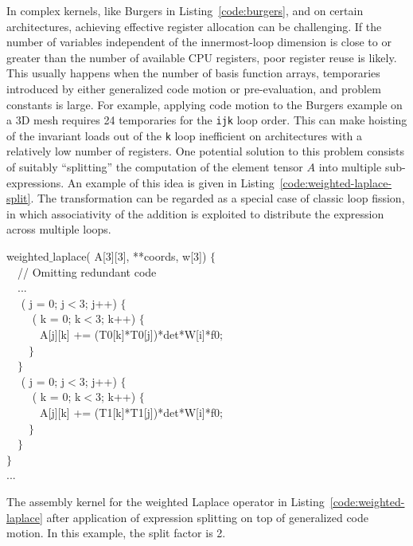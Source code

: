 In complex kernels, like Burgers in Listing~\ref{code:burgers}, and on certain architectures, achieving effective register allocation can be challenging. If the number of variables independent of the innermost-loop dimension is close to or greater than the number of available CPU registers, poor register reuse is likely. This usually happens when the number of basis function arrays, temporaries introduced by either generalized code motion or pre-evaluation, and problem constants is large. For example, applying code motion to the Burgers example on a 3D mesh requires 24 temporaries for the \texttt{ijk} loop order. This can make hoisting of the invariant loads out of the \texttt{k} loop inefficient on architectures with a relatively low number of registers. One potential solution to this problem consists of suitably ``splitting'' the computation of the element tensor $A$ into multiple sub-expressions. An example of this idea is given in Listing~\ref{code:weighted-laplace-split}. The transformation can be regarded as a special case of classic loop fission, in which associativity of the addition is exploited to distribute the expression across multiple loops. 

\begin{algorithm}
\scriptsize\ttfamily
{}

 weighted$\_$laplace( A[3][3],  **coords,  w[3]) $\lbrace$\\
~~// Omitting redundant code \\
~~...\\
~~ ( j = 0; j$<$3; j++) $\lbrace$\\
~~~~ ( k = 0; k$<$3; k++) $\lbrace$\\
~~~~~~A[j][k] += (T0[k]*T0[j])*det*W[i]*f0;\\
~~~~$\rbrace$\\
~~$\rbrace$\\
~~ ( j = 0; j$<$3; j++) $\lbrace$\\
~~~~ ( k = 0; k$<$3; k++) $\lbrace$\\
~~~~~~A[j][k] += (T1[k]*T1[j])*det*W[i]*f0;\\
~~~~$\rbrace$\\
~~$\rbrace$\\
$\rbrace$\\
...
\caption{The assembly kernel for the weighted Laplace operator in Listing~\ref{code:weighted-laplace} after application of expression splitting on top of generalized code motion. In this example, the split factor is 2.}
\label{code:weighted-laplace-split}
\end{algorithm}

